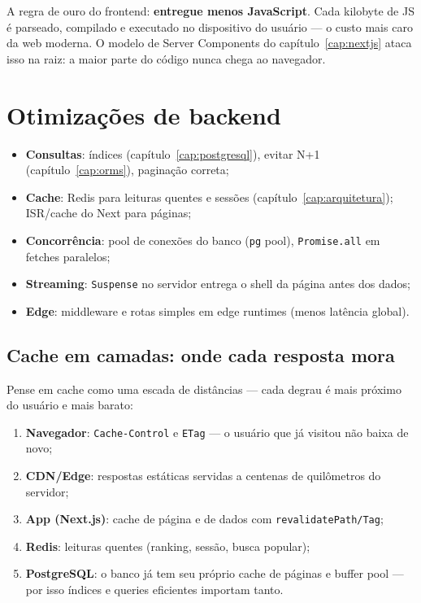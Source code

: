 \begin{caixaconceito}
A regra de ouro do frontend: \textbf{entregue menos JavaScript}. Cada
kilobyte de JS é parseado, compilado e executado no dispositivo do usuário —
o custo mais caro da web moderna. O modelo de Server Components do
capítulo~\ref{cap:nextjs} ataca isso na raiz: a maior parte do código nunca
chega ao navegador.
\end{caixaconceito}

\section{Otimizações de backend}

\begin{itemize}[leftmargin=*, itemsep=0.4em]
  \item \textbf{Consultas}: índices (capítulo~\ref{cap:postgresql}), evitar N+1 (capítulo~\ref{cap:orms}), paginação correta;
  \item \textbf{Cache}: Redis para leituras quentes e sessões (capítulo~\ref{cap:arquitetura}); ISR/cache do Next para páginas;
  \item \textbf{Concorrência}: pool de conexões do banco (\texttt{pg} pool), \texttt{Promise.all} em fetches paralelos;
  \item \textbf{Streaming}: \texttt{Suspense} no servidor entrega o shell da página antes dos dados;
  \item \textbf{Edge}: middleware e rotas simples em edge runtimes (menos latência global).
\end{itemize}

\subsection{Cache em camadas: onde cada resposta mora}

Pense em cache como uma escada de distâncias — cada degrau é mais próximo do
usuário e mais barato:

\begin{enumerate}[leftmargin=*, itemsep=0.4em]
  \item \textbf{Navegador}: \texttt{Cache-Control} e \texttt{ETag} — o usuário
  que já visitou não baixa de novo;
  \item \textbf{CDN/Edge}: respostas estáticas servidas a centenas de
  quilômetros do servidor;
  \item \textbf{App (Next.js)}: cache de página e de dados com
  \texttt{revalidatePath/Tag};
  \item \textbf{Redis}: leituras quentes (ranking, sessão, busca popular);
  \item \textbf{PostgreSQL}: o banco já tem seu próprio cache de páginas e
  buffer pool — por isso índices e queries eficientes importam tanto.
\end{enumerate}

